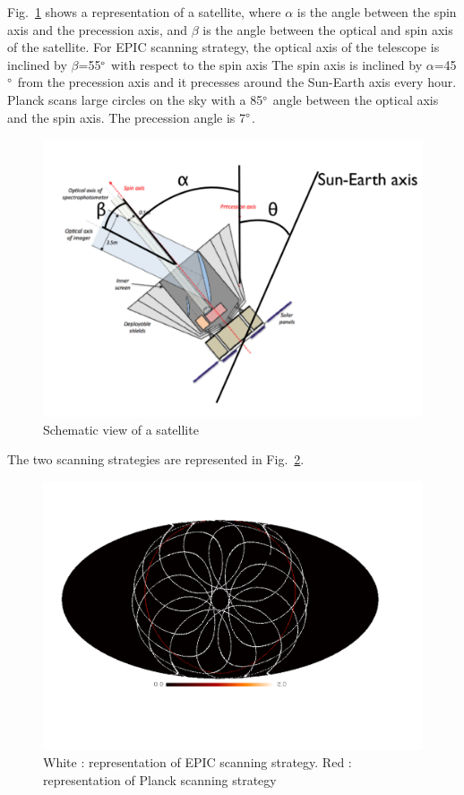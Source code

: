 Fig.~\ref{fig:satellite} shows a representation of a satellite, where $\alpha$ is the angle between the spin axis and the precession axis, and $\beta$ is the angle between the optical and spin axis of the satellite.
For EPIC scanning strategy, the optical axis of the telescope is inclined by $\beta$=55$\degree$ with respect to the spin axis The spin axis is inclined by $\alpha$=45$\degree$ from the precession axis and it precesses around the Sun-Earth axis every hour.
Planck scans large circles on the sky with a 85$\degree$ angle between the optical axis and the spin axis. The precession angle is 7$\degree$.

\begin{figure}[h]
\center
	\includegraphics[scale=0.5]{Figures/schema_satellite.png}
	\caption{Schematic view of a satellite}
	\label{fig:satellite}
\end{figure}

The two scanning strategies are represented in Fig.~\ref{fig:strat-polsat-Planck}.

\begin{figure}[h]
\center
	\includegraphics[scale=0.3]{Figures/plot_mollweide.pdf}
	\caption{White : representation of EPIC scanning strategy. Red : representation of Planck scanning strategy }
	\label{fig:strat-polsat-Planck}
\end{figure}

